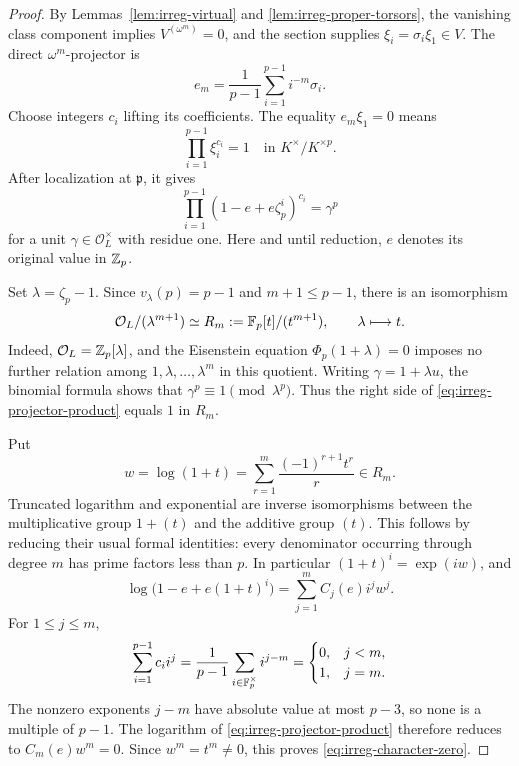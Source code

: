 \begin{proof}
By Lemmas~\ref{lem:irreg-virtual} and
\ref{lem:irreg-proper-torsors}, the vanishing class component implies
\(V^{(\omega^m)}=0\), and the section supplies
\(\xi_i=\sigma_i\xi_1\in V\). The direct \(\omega^m\)-projector is
\[
 e_m=\frac1{p-1}\sum_{i=1}^{p-1}i^{-m}\sigma_i.
\]
Choose integers \(c_i\) lifting its coefficients. The equality
\(e_m\xi_1=0\) means
\[
 \prod_{i=1}^{p-1}\xi_i^{c_i}=1
       \quad\text{in }K^\times/K^{\times p}.
\]
After localization at \(\mathfrak p\), it gives
\begin{equation}
 \prod_{i=1}^{p-1}(1-e+e\zeta_p^i)^{c_i}=\gamma^p
 \label{eq:irreg-projector-product}
\end{equation}
for a unit \(\gamma\in\mathcal O_L^\times\) with residue one.
Here and until reduction, \(e\) denotes its original value in
\(\mathbb Z_p\).

Set \(\lambda=\zeta_p-1\). Since \(v_\lambda(p)=p-1\) and
\(m+1\leq p-1\), there is an isomorphism
\begin{equation}
 \mathcal O_L/(\lambda^{m+1})
       \simeq R_m:=\mathbb F_p[t]/(t^{m+1}),\qquad
 \lambda\longmapsto t.
 \label{eq:irreg-trunc-ring}
\end{equation}
Indeed, \(\mathcal O_L=\mathbb Z_p[\lambda]\), and the Eisenstein equation
\(\Phi_p(1+\lambda)=0\) imposes no further relation among
\(1,\lambda,\ldots,\lambda^m\) in this quotient.
Writing \(\gamma=1+\lambda u\), the binomial formula shows that
\(\gamma^p\equiv1\pmod{\lambda^p}\). Thus the right side of
\eqref{eq:irreg-projector-product} equals \(1\) in \(R_m\).

Put
\[
 w=\log(1+t)=\sum_{r=1}^m\frac{(-1)^{r+1}t^r}{r}\in R_m.
\]
Truncated logarithm and exponential are inverse isomorphisms
between the multiplicative group \(1+(t)\) and the additive group
\((t)\). This follows by reducing their usual formal identities:
every denominator occurring through degree \(m\) has prime factors
less than \(p\). In particular \((1+t)^i=\exp(iw)\), and
\[
 \log\bigl(1-e+e(1+t)^i\bigr)
       =\sum_{j=1}^m C_j(e)i^j w^j.
\]
For \(1\leq j\leq m\),
\[
 \sum_{i=1}^{p-1}c_i i^j
       =\frac1{p-1}\sum_{i\in\mathbb F_p^\times}i^{j-m}
       =
       \begin{cases}
          0,&j<m,\\
          1,&j=m.
       \end{cases}
\]
The nonzero exponents \(j-m\) have absolute value at most \(p-3\),
so none is a multiple of \(p-1\). The logarithm of
\eqref{eq:irreg-projector-product} therefore reduces to
\(C_m(e)w^m=0\). Since \(w^m=t^m\neq0\), this proves
\eqref{eq:irreg-character-zero}.


\end{proof}
